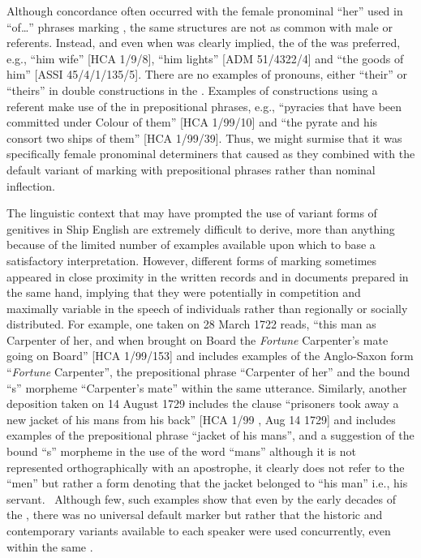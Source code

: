 Although  concordance often occurred with the  female pronominal  “her” used in “of…” phrases marking , the same structures are not as common with male or  referents. Instead, and even when  was clearly implied, the  of the  was preferred, e.g., “him wife” [HCA 1/9/8], “him lights” [ADM 51/4322/4] and “the goods of him” [ASSI 45/4/1/135/5]. There are no examples of    pronouns, either “their” or “theirs” in double  constructions in the . Examples of constructions using a   referent make use of the  in prepositional phrases, e.g., “pyracies that have been committed under Colour of them” [HCA 1/99/10] and “the pyrate and his consort two ships of them” [HCA 1/99/39]. Thus, we might surmise that it was specifically female pronominal determiners that caused  as they combined with the default variant of marking  with prepositional phrases rather than nominal inflection. 

The linguistic context that may have prompted the use of variant forms of genitives in Ship English are extremely difficult to derive, more than anything because of the limited number of examples available upon which to base a satisfactory interpretation. However, different forms of marking  sometimes appeared in close proximity in the written records and in documents prepared in the same hand, implying that they were potentially in competition and maximally variable in the speech of individuals rather than regionally or socially distributed. For example, one  taken on 28 March {1722} reads, “this man as Carpenter of her, and when brought on Board the \textit{Fortune} Carpenter’s mate going on Board” [HCA 1/99/153] and includes examples of the Anglo-Saxon  form “\textit{Fortune} Carpenter”, the prepositional  phrase “Carpenter of her” and the bound “s” morpheme “Carpenter’s mate” within the same utterance. Similarly, another deposition taken on 14 August {1729} includes the clause “prisoners took away a new jacket of his mans from his back” [HCA 1/99 , Aug 14 1729] and includes examples of the prepositional  phrase “jacket of his mans”, and a suggestion of the bound “s” morpheme in the use of the word “mans” although it is not represented orthographically with an apostrophe, it clearly does not refer to the  “men” but rather a  form denoting that the jacket belonged to “his man” i.e., his servant. ~Although few, such examples show that even by the early decades of the , there was no universal default  marker but rather that the historic and contemporary variants available to each speaker were used concurrently, even within the same . 

